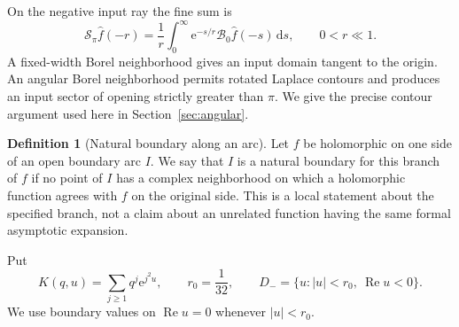 \documentclass[11pt,a4paper]{article}
\numberwithin{equation}{section}
\theoremstyle{definition}
\newtheorem{definition}[theorem]{Definition}
\theoremstyle{remark}
\newcommand{\ee}{\mathrm e}
\newcommand{\dd}{\mathrm d}
\newcommand{\Ree}{\operatorname{Re}}
\newcommand{\B}{\mathcal B_0}
\begin{document}
On the negative input ray the fine sum is
\begin{equation}
 \mathcal S_\pi\widehat f(-r)
   =\frac1r\int_0^\infty\ee^{-s/r}\B\widehat f(-s)\,\dd s,
 \qquad 0<r\ll1.
 \label{eq:negative-laplace}
\end{equation}
A fixed-width Borel neighborhood gives an input domain tangent to the
origin.  An angular Borel neighborhood permits rotated Laplace contours
and produces an input sector of opening strictly greater than $\pi$.
We give the precise contour argument used here in
Section~\ref{sec:angular}.

\begin{definition}[Natural boundary along an arc]
Let $f$ be holomorphic on one side of an open boundary arc $I$.  We say
that $I$ is a natural boundary for this branch of $f$ if no point of $I$
has a complex neighborhood on which a holomorphic function agrees with
$f$ on the original side.  This is a local statement about the specified
branch, not a claim about an unrelated function having the same formal
asymptotic expansion.
\end{definition}

Put
\begin{equation}
 K(q,u)=\sum_{j\ge1}q^j\ee^{j^2u},\qquad
 r_0=\frac1{32},\qquad
 D_- =\{u:|u|<r_0,\ \Ree u<0\}.
 \label{eq:kernel-domain}
\end{equation}
We use boundary values on $\Ree u=0$ whenever $|u|<r_0$.
\end{document}
